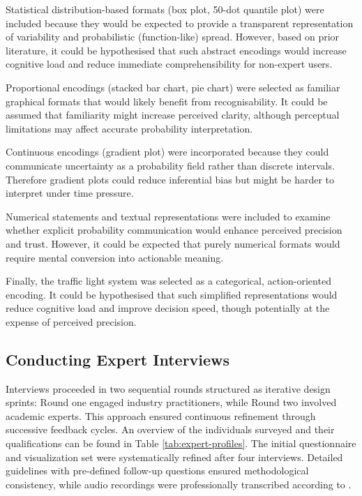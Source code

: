 \documentclass[final,journal,a4paper]{IEEEtran}
\begin{document}
Statistical distribution-based formats (box plot, 50-dot quantile plot) were included because they would be expected to provide a transparent representation of variability and probabilistic (function-like) spread. However, based on prior literature, it could be hypothesised that such abstract encodings would increase cognitive load and reduce immediate comprehensibility for non-expert users.

Proportional encodings (stacked bar chart, pie chart) were selected as familiar graphical formats that would likely benefit from recognisability. It could be assumed that familiarity might increase perceived clarity, although perceptual limitations may affect accurate probability interpretation.

Continuous encodings (gradient plot) were incorporated because they could communicate uncertainty as a probability field rather than discrete intervals. Therefore gradient plots could reduce inferential bias but might be harder to interpret under time pressure.

Numerical statements and textual representations were included to examine whether explicit probability communication would enhance perceived precision and trust. However, it could be expected that purely numerical formats would require mental conversion into actionable meaning.

Finally, the traffic light system was selected as a categorical, action-oriented encoding. It could be hypothesised that such simplified representations would reduce cognitive load and improve decision speed, though potentially at the expense of perceived precision.

\subsection{Conducting Expert Interviews}
Interviews proceeded in two sequential rounds structured as iterative design sprints: Round one engaged industry practitioners, while Round two involved academic experts. This approach ensured continuous refinement through successive feedback cycles. An overview of the individuals surveyed and their qualifications can be found in Table \ref{tab:expert-profiles}. The initial questionnaire and visualization set were systematically refined after four interviews. Detailed guidelines with pre-defined follow-up questions ensured methodological consistency, while audio recordings were professionally transcribed according to \cite{Blasius2019}.
\end{document}
